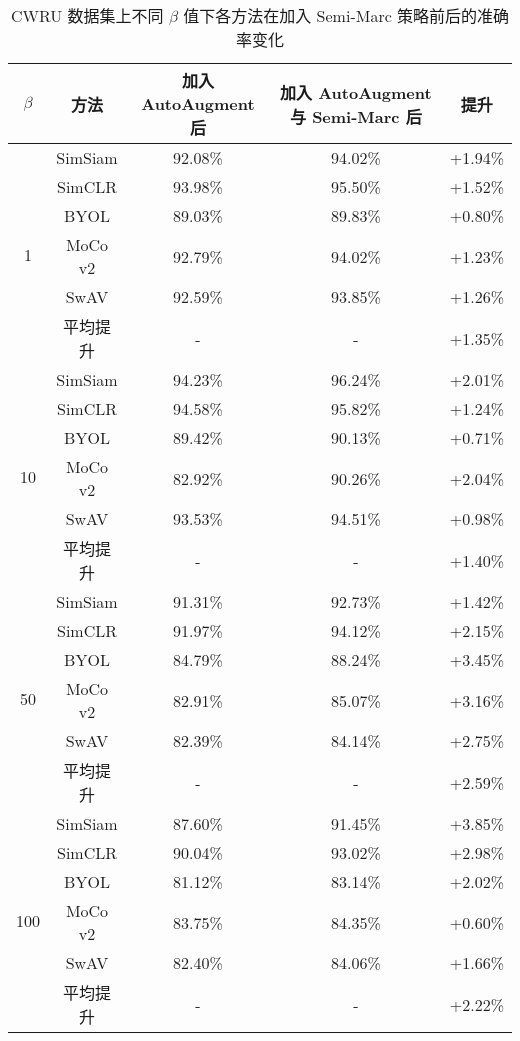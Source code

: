 \documentclass[master]{thesis-uestc}
\begin{document}
\begin{table}[!h]
    \caption{CWRU 数据集上不同 $\beta$ 值下各方法在加入 Semi-Marc 策略前后的准确率变化}
    \centering
    \renewcommand\arraystretch{1.2}
    \begin{tabular}{ccccc}
    \toprule
    $\beta$ & 方法 & 加入 AutoAugment 后 & 加入 AutoAugment 与 Semi-Marc 后 & 提升 \\
    \midrule
    \multirow{6}{*}{1}   
        & SimSiam & 92.08\% & 94.02\% & +1.94\% \\
        & SimCLR  & 93.98\% & 95.50\% & +1.52\% \\
        & BYOL    & 89.03\% & 89.83\% & +0.80\% \\
        & MoCo v2 & 92.79\% & 94.02\% & +1.23\% \\
        & SwAV    & 92.59\% & 93.85\% & +1.26\% \\
        & 平均提升    & - & - & +1.35\% \\
    \midrule
    \multirow{6}{*}{10}  
        & SimSiam & 94.23\% & 96.24\% & +2.01\% \\
        & SimCLR  & 94.58\% & 95.82\% & +1.24\% \\
        & BYOL    & 89.42\% & 90.13\% & +0.71\% \\
        & MoCo v2 & 82.92\% & 90.26\% & +2.04\% \\
        & SwAV    & 93.53\% & 94.51\% & +0.98\% \\
        & 平均提升    & - & - & +1.40\% \\
    \midrule
    \multirow{6}{*}{50}  
        & SimSiam & 91.31\% & 92.73\% & +1.42\% \\
        & SimCLR  & 91.97\% & 94.12\% & +2.15\% \\
        & BYOL    & 84.79\% & 88.24\% & +3.45\% \\
        & MoCo v2 & 82.91\% & 85.07\% & +3.16\% \\
        & SwAV    & 82.39\% & 84.14\% & +2.75\% \\
        & 平均提升    & - & - & +2.59\% \\
    \midrule
    \multirow{6}{*}{100} 
        & SimSiam & 87.60\% & 91.45\% & +3.85\% \\
        & SimCLR  & 90.04\% & 93.02\% & +2.98\% \\
        & BYOL    & 81.12\% & 83.14\% & +2.02\% \\
        & MoCo v2 & 83.75\% & 84.35\% & +0.60\% \\
        & SwAV    & 82.40\% & 84.06\% & +1.66\% \\
        & 平均提升    & - & - & +2.22\% \\
    \bottomrule
    \end{tabular}
    \label{tab:longtail_Semi-Marc_comparison}
\end{table}
\end{document}
